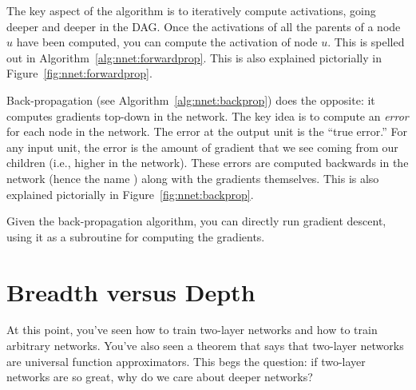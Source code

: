\MoveNextFigure{-8cm}

The key aspect of the  algorithm is to
iteratively compute activations, going deeper and deeper in the DAG.
Once the activations of all the parents of a node $u$ have been
computed, you can compute the activation of node $u$.  This is spelled
out in Algorithm~\ref{alg:nnet:forwardprop}.  This is also explained
pictorially in Figure~\ref{fig:nnet:forwardprop}.


Back-propagation (see Algorithm~\ref{alg:nnet:backprop}) does the
opposite: it computes gradients top-down in the network.  The key idea
is to compute an \emph{error} for each node in the network.  The error
at the output unit is the ``true error.''  For any input unit, the
error is the amount of gradient that we see coming from our children
(i.e., higher in the network).  These errors are computed backwards in
the network (hence the name ) along with the
gradients themselves.  This is also explained pictorially in
Figure~\ref{fig:nnet:backprop}.

Given the back-propagation algorithm, you can directly run gradient
descent, using it as a subroutine for computing the gradients.

\section{Breadth versus Depth}

At this point, you've seen how to train two-layer networks and how to
train arbitrary networks.  You've also seen a theorem that says that
two-layer networks are universal function approximators.  This begs
the question: if two-layer networks are so great, why do we care about
deeper networks?


